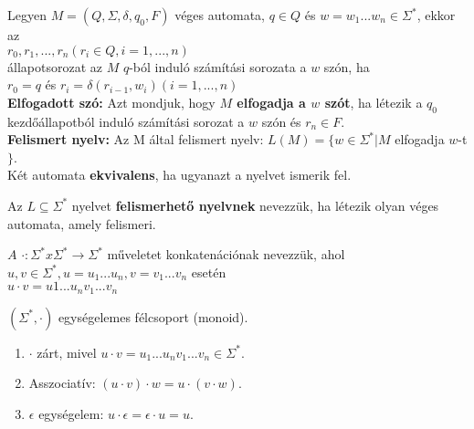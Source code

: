 \documentclass{beamer}
\newcommand{\mmedskip}{\vspace{0.5em}}
\newcommand{\mbigskip}{\vspace{1em}}
\begin{document}
\begin{frame}
\begin{tcolorbox}[squeezed title={Def.: Számítási sorozat, elfogadott szó, felismert nyelv}]
Legyen $M = (Q, {\Sigma}, {\delta}, q_0, F)$ véges automata, $q \in Q$ és $w = w_1...w_n \in {\Sigma}^*$, ekkor az\\
\mmedskip
$r_0, r_1, ..., r_n (r_i \in Q, i = 1, ..., n)$\\
\mmedskip
állapotsorozat az $M$ $q$-ból induló számítási sorozata a $w$ szón, ha\\
\mmedskip
$r_0 = q$ és $r_i = {\delta}(r_{i - 1}, w_i)(i = 1, ..., n)$\\
\mbigskip
\textbf{Elfogadott szó:} Azt mondjuk, hogy \textbf{$M$ elfogadja a $w$ szót}, ha létezik a $q_0$ kezdőállapotból induló számítási sorozat a $w$ szón és $r_n \in F$.\\
\mbigskip
\textbf{Felismert nyelv:} Az M által felismert nyelv: $L(M) = \{w \in {\Sigma}^* | M$ elfogadja $w$-t$\}$.\\
\mbigskip
Két automata \textbf{ekvivalens}, ha ugyanazt a nyelvet ismerik fel.
\end{tcolorbox}

\begin{tcolorbox}[title={Def.: Felismerhető nyelv}]
Az $L \subseteq {\Sigma}^*$ nyelvet \textbf{felismerhető nyelvnek} nevezzük, ha létezik olyan véges automata, amely felismeri.
\end{tcolorbox}

\begin{tcolorbox}[title={Def.: Konkatenáció}]
$A$ $\cdot : {\Sigma}^* x {\Sigma}^* \rightarrow {\Sigma}^*$ műveletet konkatenációnak nevezzük, ahol\\
\mmedskip
$u, v \in {\Sigma}^*, u = u_1...u_n, v = v_1...v_n$ esetén\\
$u \cdot v = u1...u_nv_1...v_n$
\end{tcolorbox}

\begin{tcolorbox}[title={Ész}]
$({\Sigma}^*, {\cdot})$ egységelemes félcsoport (monoid).\\
\begin{enumerate}
\item $\cdot$ zárt, mivel $u \cdot v = u_1...u_nv_1...v_n \in {\Sigma}^*$.
\item Asszociatív: $(u \cdot v) \cdot w = u \cdot (v \cdot w)$.
\item $\epsilon$ egységelem: $u \cdot \epsilon = \epsilon \cdot u = u$.
\end{enumerate}
\end{tcolorbox}

\end{frame}
\end{document}
